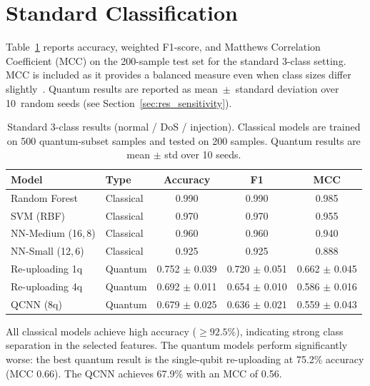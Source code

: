 \section{Standard Classification}
\label{sec:res_standard}

Table~\ref{tab:res_standard} reports accuracy, weighted F1-score, and Matthews Correlation Coefficient (MCC) on the 200-sample test set for the standard 3-class setting. MCC is included as it provides a balanced measure even when class sizes differ slightly~\cite{chicco2020advantages}. Quantum results are reported as mean~$\pm$~standard deviation over 10~random seeds (see Section~\ref{sec:res_sensitivity}).

\begin{table}[ht]
\centering
\begin{tabular}{llccc}
    \toprule
    \textbf{Model} & \textbf{Type} & \textbf{Accuracy} & \textbf{F1} & \textbf{MCC} \\
    \midrule
    Random Forest          & Classical & 0.990 & 0.990 & 0.985 \\
    SVM (RBF)              & Classical & 0.970 & 0.970 & 0.955 \\
    NN-Medium (16,\,8)     & Classical & 0.960 & 0.960 & 0.940 \\
    NN-Small (12,\,6)      & Classical & 0.925 & 0.925 & 0.888 \\
    \midrule
    Re-uploading 1q        & Quantum   & 0.752 $\pm$ 0.039 & 0.720 $\pm$ 0.051 & 0.662 $\pm$ 0.045 \\
    Re-uploading 4q        & Quantum   & 0.692 $\pm$ 0.011 & 0.654 $\pm$ 0.010 & 0.586 $\pm$ 0.016 \\
    QCNN (8q)              & Quantum   & 0.679 $\pm$ 0.025 & 0.636 $\pm$ 0.021 & 0.559 $\pm$ 0.043 \\
    \bottomrule
\end{tabular}
\caption{Standard 3-class results (normal / DoS / injection). Classical models are trained on 500 quantum-subset samples and tested on 200 samples. Quantum results are mean $\pm$ std over 10 seeds.}
\label{tab:res_standard}
\end{table}

All classical models achieve high accuracy ($\geq 92.5\%$), indicating strong class separation in the selected features. The quantum models perform significantly worse: the best quantum result is the single-qubit re-uploading at 75.2\% accuracy (MCC 0.66). The QCNN achieves 67.9\% with an MCC of 0.56.

